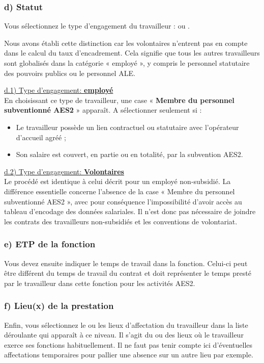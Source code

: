 \subsubsection{d) Statut}
Vous sélectionnez le type d’engagement du travailleur :  ou .

\begin{remarque} Nous avons établi cette distinction car les volontaires n’entrent pas en compte dans le calcul du taux d’encadrement. Cela signifie que tous les autres travailleurs sont globalisés dans la catégorie « employé », y compris le personnel statutaire des pouvoirs publics ou le personnel ALE.
\end{remarque}

\underline{d.1) Type d'engagement: \textbf{employé}}\\
En choisissant ce type de travailleur, une case « \textbf{Membre du personnel subventionné AES2} » apparaît. A sélectionner seulement si : \begin{itemize}
    \item Le travailleur possède un lien contractuel ou statutaire avec l’opérateur d’accueil agréé ;
    \item Son salaire est couvert, en partie ou en totalité, par la subvention AES2.
\end{itemize}

\underline{d.2) Type d'engagement: \textbf{Volontaires}}\\
Le procédé est identique à celui décrit pour un employé non-subsidié.
La différence essentielle concerne l’absence de la case « Membre du personnel subventionné AES2 », avec pour conséquence l’impossibilité d’avoir accès au tableau d’encodage des données salariales. Il n’est donc pas nécessaire de joindre les contrats des travailleurs non-subsidiés et les conventions de volontariat.

\subsubsection{e) ETP de la fonction}
Vous devez ensuite indiquer le temps de travail dans la fonction. Celui-ci peut être différent du temps de travail du contrat et doit représenter le temps presté par le travailleur dans cette fonction pour les activités AES2.




\subsubsection{f) Lieu(x) de la prestation}
Enfin, vous sélectionnez le ou les lieux d’affectation du travailleur dans la liste déroulante qui apparaît à ce niveau. Il s’agit du ou des lieux où le travailleur exerce ses fonctions habituellement. Il ne faut pas tenir compte ici d’éventuelles affectations temporaires pour pallier une absence sur un autre lieu par exemple.


